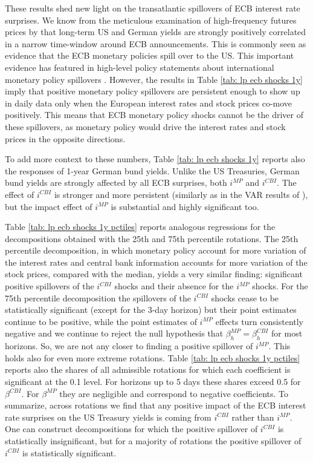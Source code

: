 \documentclass[a4paper,12pt]{article}
\begin{document}
These results shed new light on the transatlantic spillovers of ECB interest rate surprises.
We know from the meticulous examination of high-frequency futures prices by \cite{Curcuru_etal_2018} that long-term US and German yields are strongly positively correlated in a narrow time-window around ECB announcements. 
This is commonly seen as evidence that the ECB monetary policies spill over to the US.
This important evidence has featured
in high-level policy statements about international monetary policy spillovers \citep{Powell_2018,Clarida_2021}. 
However, the results in Table \ref{tab: lp ecb shocks 1y} imply that positive monetary policy spillovers
are persistent enough to show up in daily data only when the European interest rates and stock prices co-move positively.
This means that ECB monetary policy shocks cannot be the driver of these spillovers, as monetary
policy would drive the interest rates and stock prices in the opposite directions.

To add more context to these numbers, Table \ref{tab: lp ecb shocks 1y}  reports also the responses of 1-year German bund yields. Unlike the US Treasuries, German bund yields are strongly affected by all ECB surprises,
both $i^{MP}$ and $i^{CBI}$.
The effect of $i^{CBI}$ is stronger and more persistent (similarly as in the VAR results of \citealp{Jarocinski_Karadi_2020}), but the impact effect of $i^{MP}$ is substantial and highly significant too. 

Table \ref{tab: lp ecb shocks 1y pctiles} reports analogous regressions for the decompositions obtained with the 25th and 75th percentile rotations. The 25th percentile decomposition, in which
monetary policy account for more variation of the interest rates and central bank information accounts for more variation of the stock prices, compared with the median,
 yields a very similar finding: significant positive spillovers of the $i^{CBI}$ shocks
and their absence for the $i^{MP}$ shocks. For the 75th percentile decomposition the spillovers
of the $i^{CBI}$ shocks cease to be statistically significant (except for the 3-day horizon)
but their point estimates continue to be positive, while the point estimates of $i^{MP}$
effects turn consistently negative and we continue to reject the null hypothesis that $\beta^{MP}_h=\beta^{CBI}_h$ for most horizons. So, we are not any closer to finding a positive spillover of $i^{MP}$. This holds also for even more extreme rotations.
Table \ref{tab: lp ecb shocks 1y pctiles} reports also the shares of all admissible rotations for which each coefficient is significant at the 0.1 level. For horizons up to 5 days these shares exceed 0.5 for $\beta^{CBI}$. For $\beta^{MP}$ they are negligible and correspond to negative coefficients.
To summarize, across rotations we find that any positive impact of the ECB interest rate surprises on the US Treasury yields is coming from $i^{CBI}$ rather than $i^{MP}$. One can construct decompositions for which the positive spillover of $i^{CBI}$ is statistically insignificant, but for a majority of rotations the positive spillover of $i^{CBI}$ is statistically significant.
\end{document}
